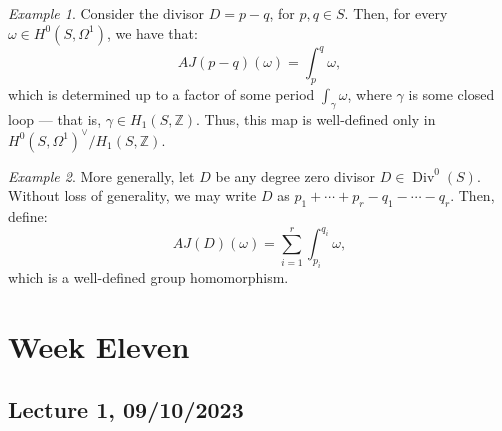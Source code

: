 \documentclass[a4paper]{report}
\theoremstyle{definition}
\theoremstyle{remark}
\theoremstyle{proposition}
\theoremstyle{conjecture}
\theoremstyle{lemma}
\theoremstyle{corollary}
\theoremstyle{exercise}
\theoremstyle{example}
\newtheorem{example}{Example}
\newcommand{\on}{\operatorname}
\begin{document}
\begin{example}
    Consider the divisor $D=p-q$, for $p,q \in S$.
    Then, for every $\omega \in H^0(S,\Omega^1)$, we have that:
    $$AJ(p-q)(\omega) = \int_p^q\omega,$$
    which is determined up to a factor of some period $\int_\gamma\omega$, where
    $\gamma$ is some closed loop --- that is, $\gamma \in H_1(S,\mathbb{Z})$.
    Thus, this map is well-defined only in 
    $H^0(S,\Omega^1)^\vee/H_1(S,\mathbb{Z})$.
\end{example}

\begin{example}
    More generally, let $D$ be any degree zero divisor $D \in \on{Div}^0(S)$.
    Without loss of generality, we may write $D$ as $p_1+\cdots+p_r -q_1- \cdots -q_r$.
    Then, define:
    $$AJ(D)(\omega) = \sum_{i=1}^r \int_{p_i}^{q_i}\omega,$$
    which is a well-defined group homomorphism.
\end{example}

\chapter{Week Eleven}

\section{Lecture 1, 09/10/2023}
\end{document}
